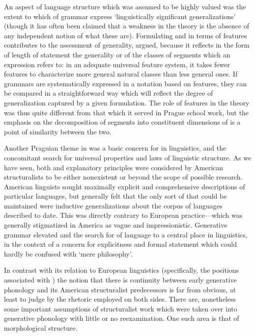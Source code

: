 An aspect of language structure which was assumed to be highly valued
was the extent to which  of grammar express `linguistically
significant generalizations' (though it has often been claimed that a
weakness in the theory is the absence of any independent notion of
what these are). Formulating  and  in terms of
features contributes to the assessment of generality,
\citet{halle62:pigg,halle64:bases} argued, because it reflects in the
form of length of statement the generality or  of the
classes of segments which an expression refers to: in an adequate
universal feature system, it takes fewer features to characterize more
general natural classes than less general ones. If grammars are
systematically expressed in a notation based on features, they can be
compared in a straightforward way which will reflect the degree of
generalization captured by a given formulation. The role of features
in the theory was thus quite different from that which it served in
Prague school work, but the emphasis on the decomposition of segments
into constituent dimensions of  is a point of similarity
between the two.

Another Praguian theme in  was a basic concern for
 in linguistics, and the concomitant search for universal
properties and laws of linguistic structure. As we have seen, both
 and explanatory principles were considered by American
structuralists to be either nonexistent or beyond the scope of
possible research. American linguists sought maximally explicit and
comprehensive descriptions of particular languages, but generally felt
that the only sort of  that could be maintained were
inductive generalizations about the corpus of languages described to
date. This was directly contrary to European practice—which was
generally stigmatized in America as vague and
impressionistic. Generative grammar elevated  and the
search for  of language to a central place in linguistics,
in the context of a concern for explicitness and formal statement
which could hardly be confused with `mere philosophy'.

In {contrast} with its relation to European linguistics (specifically,
the positions associated with {\Jakobson}) the notion that there is
continuity between early generative phonology and its American
structuralist predecessors is far from obvious, at least to judge by
the rhetoric employed on both sides. There are, nonetheless some
important assumptions of structuralist work which were taken over into
generative phonology with little or no reexamination. One such area is
that of morphological structure.

